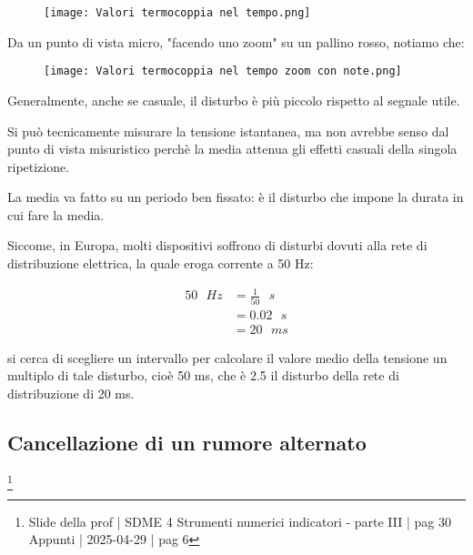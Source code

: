 \begin{figure}[h]
    \centering
    \texttt{[image: Valori termocoppia nel tempo.png]}
\end{figure} 

Da un punto di vista micro, "facendo uno zoom" su un pallino rosso, notiamo che: 

\begin{figure}[h]
    \centering
    \texttt{[image: Valori termocoppia nel tempo zoom con note.png]}
\end{figure} 

Generalmente, anche se casuale, il disturbo è più piccolo rispetto al segnale utile. \newline 

Si può tecnicamente misurare la tensione istantanea, ma non avrebbe senso dal punto di vista misuristico perchè 
la media attenua gli effetti casuali della singola ripetizione. \newline 

La media va fatto su un periodo ben fissato: è il disturbo che impone la durata in cui fare la media. \newline 

Siccome, in Europa, molti dispositivi soffrono di disturbi dovuti 
alla rete di distribuzione elettrica, la quale eroga corrente a 50 Hz: 

{
    \Large 
    \begin{equation}
        \begin{split}
        50 \text{ } Hz 
        &= 
        \frac{1}{50} \text{ } s
        \\ 
        &= 
        0.02 \text{ } s
        \\ 
        &= 
        20 \text{ } ms
        \end{split}
    \end{equation}
}

si cerca di scegliere un intervallo per calcolare il valore medio della tensione 
un multiplo di tale disturbo, cioè 50 ms, che è 2.5 il disturbo della rete di distribuzione di 20 ms. \newline 

\newpage 

\subsection{Cancellazione di un rumore alternato}
\footnote{Slide della prof | SDME 4 Strumenti numerici indicatori - parte III | pag  30 \\  
Appunti | 2025-04-29 | pag 6} 

